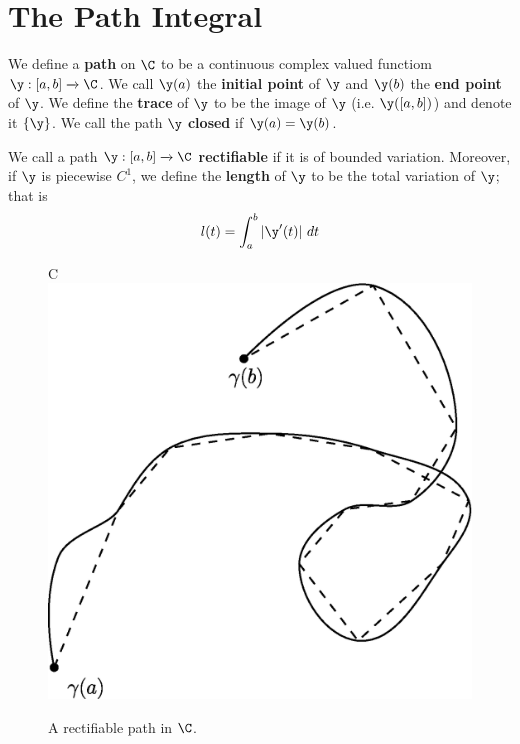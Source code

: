 \section{The Path Integral}

\begin{definition}
    We define a \textbf{path} on $\C$ to be a continuous complex valued
    functiom $\y:[a,b] \xrightarrow{} \C$. We call $\y(a)$ the \textbf{initial
    point} of $\y$ and $\y(b)$ the \textbf{end point} of $\y$. We define the
    \textbf{trace} of $\y$ to be the image of  $\y$  (i.e. $\y([a,b])$) and
    denote it $\{\y\}$. We call the path $\y$  \textbf{closed} if $\y(a)=\y(b)$.
\end{definition}

\begin{definition}
    We call a path $\y:[a,b] \xrightarrow{} \C$ \textbf{rectifiable} if it is of
    bounded variation. Moreover, if $\y$ is piecewise $C^1$, we  define the
    \textbf{length} of $\y$ to be the total variation of $\y$; that is
    \begin{equation*}
        l(t)=\int_a^b{|\y'(t)| \ dt}
    \end{equation*}
\end{definition}

\begin{figure}[h]
    C\centering
    \includegraphics[scale=0.5]{Figures/chapter4/rectifiable_curve.eps}
    \caption{A rectifiable path in $\C$.}
    \label{figure_4.1}
\end{figure}

